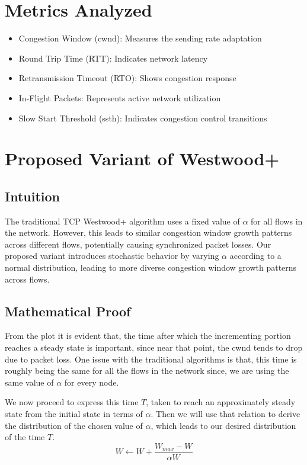 \documentclass[12pt,a4paper]{report}
\begin{document}
\section{Metrics Analyzed}
\begin{itemize}
\item Congestion Window (cwnd): Measures the sending rate adaptation
\item Round Trip Time (RTT): Indicates network latency
\item Retransmission Timeout (RTO): Shows congestion response
\item In-Flight Packets: Represents active network utilization
\item Slow Start Threshold (ssth): Indicates congestion control transitions
\end{itemize}
\newpage\section{Proposed Variant of Westwood+}
\subsection{Intuition}
The traditional TCP Westwood+ algorithm uses a fixed value of $\alpha$ for all flows in the network. However, this leads to similar congestion window growth patterns across different flows, potentially causing synchronized packet losses. Our proposed variant introduces stochastic behavior by varying $\alpha$ according to a normal distribution, leading to more diverse congestion window growth patterns across flows.

\subsection{Mathematical Proof}
From the plot it is evident that, the time after which the incrementing portion reaches a steady state is important, since near that point, the cwnd tends to drop due to packet loss. One issue with the traditional algorithms is that, this time is roughly being the same for all the flows in the network since, we are using the same value of $\alpha$ for every node.

We now proceed to express this time $T$, taken to reach an approximately steady state from the initial state in terms of $\alpha$. Then we will use that relation to derive the distribution of the chosen value of $\alpha$, which leads to our desired distribution of the time $T$.
\begin{equation*}
W \leftarrow W + \frac{W_{max} - W}{\alpha W}
\end{equation*}
\end{document}
